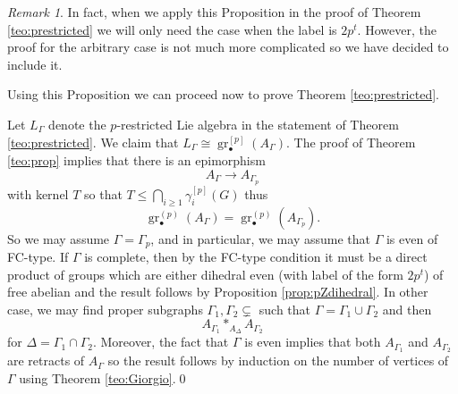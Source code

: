 \documentclass[10pt, oneside]{amsart}
\newcommand{\gr}{\operatorname{gr}} %
\theoremstyle{definition}
\theoremstyle{remark}
\newtheorem{remark}[theorem]{Remark}
\theoremstyle{plain}
\begin{document}
{\begin{remark}
    In fact, when we apply this Proposition in the proof of Theorem \ref{teo:prestricted} we will only need the case when the label is $2p^t$. However, the proof for the arbitrary case is not much more complicated so we have decided to include it.
\end{remark}
}\fi


 Using this Proposition we can proceed now to prove Theorem \ref{teo:prestricted}.  
 
  \bigskip
 
  Let $L_\Gamma$ denote the $p$-restricted Lie algebra 
 in the statement of Theorem \ref{teo:prestricted}.
 We claim that $L_\Gamma\cong\gr_\bullet^{[p]}(A_\Gamma)$. The proof of Theorem \ref{teo:prop} implies that there is an epimorphism
 $$A_\Gamma\to A_{\Gamma_p}$$
with kernel $T$ so that $T\leq\bigcap_{i\geq 1}\gamma_i^{[p]}(G)$ thus
$$\gr_\bullet^{(p)}(A_\Gamma)=\gr_\bullet^{(p)}(A_{\Gamma_p}).$$
So we may assume $\Gamma=\Gamma_p$, and in particular, we may assume that $\Gamma$ is even of FC-type. If $\Gamma$ is complete, then by the FC-type condition it must be a direct product of groups which are either dihedral even (with label of the form $2p^t$) of free abelian and the result follows by Proposition \ref{prop:pZdihedral}. In other case, we may find proper subgraphs $\Gamma_1,\Gamma_2\subsetneq$ such that $\Gamma=\Gamma_1\cup\Gamma_2$ and then
$$A_{\Gamma_1}\ast_{A_\Delta}A_{\Gamma_2}$$
for $\Delta=\Gamma_1\cap\Gamma_2$. Moreover, the fact that $\Gamma$ is even implies that both $A_{\Gamma_1}$ and $A_{\Gamma_2}$ are retracts of $A_\Gamma$ so the result follows by induction on the number of vertices of $\Gamma$ using Theorem \ref{teo:Giorgio}.\qed
\end{document}
